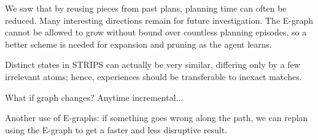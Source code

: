 \documentclass[letterpaper]{article}
\begin{document}
We saw that by reusing pieces from past plans, planning time can often be reduced. Many interesting directions remain for future investigation. The E-graph cannot be allowed to grow without bound over countless planning episodes, so a better scheme is needed for expansion and pruning as the agent learns.

Distinct states in STRIPS can actually be very similar, differing only by a few irrelevant atoms; hence, experiences should be transferable to inexact matches.

What if graph changes? Anytime incremental...

Another use of E-graphs: if something goes wrong along the path, we can replan using the E-graph to get a faster and less disruptive result.



\end{document}
